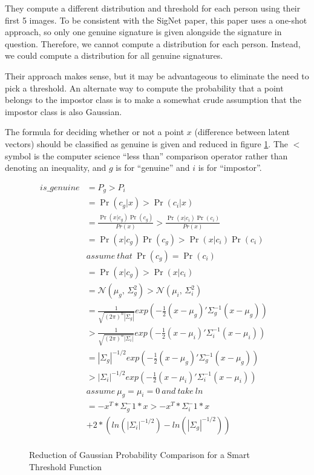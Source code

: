 They compute a different distribution and threshold for each person using their first 5 images.
To be consistent with the SigNet paper, this paper uses a one-shot approach, so only one genuine signature is given alongside the signature in question.
Therefore, we cannot compute a distribution for each person.
Instead, we could compute a distribution for all genuine signatures.

Their approach makes sense, but it may be advantageous to eliminate the need to pick a threshold.
An alternate way to compute the probability that a point belongs to the impostor class is to make a somewhat crude assumption that the impostor class is also Gaussian.

The formula for deciding whether or not a point $x$ (difference between latent vectors) should be classified as genuine is given and reduced in figure \ref{proof:gaussian}.
The $<$ symbol is the computer science ``less than'' comparison operator rather than denoting an inequality, and $g$ is for ``genuine'' and $i$ is for ``impostor''.

\begin{figure}
\begin{align*}
is\_genuine & = P_g > P_i&\\
        & = \Pr(c_g|x) > \Pr(c_i|x)&\\
        & = \frac{\Pr(x|c_g)\Pr(c_g)}{Pr(x)} > \frac{\Pr(x|c_i)\Pr(c_i)}{Pr(x)}&\\
        & = \Pr(x|c_g)\Pr(c_g) > \Pr(x|c_i)\Pr(c_i)&\\
        & assume\ that\ \Pr(c_g) = \Pr(c_i)&\\ %
        & = \Pr(x|c_g) > \Pr(x|c_i)&\\
        & = \mathcal{N}(\mu_g,\,\Sigma_g^{2}) > \mathcal{N}(\mu_i,\,\Sigma_i^{2})&\\
        & = \frac{1}{\sqrt{(2\pi)^{n}|\Sigma_g|}}exp(-\frac{1}{2}(x-\mu_g)'\Sigma_g^{-1}(x-\mu_g))&\\
        & > \frac{1}{\sqrt{(2\pi)^{n}|\Sigma_i|}}exp(-\frac{1}{2}(x-\mu_i)'\Sigma_i^{-1}(x-\mu_i))&\\
        & = |\Sigma_g|^{-1/2}exp(-\frac{1}{2}(x-\mu_g)'\Sigma_g^{-1}(x-\mu_g))&\\
        & > |\Sigma_i|^{-1/2}exp(-\frac{1}{2}(x-\mu_i)'\Sigma_i^{-1}(x-\mu_i))&\\
        & assume\ \mu_g = \mu_i = 0\ and\ take\ ln&\\
        & = -x^T * \Sigma_g^-1 * x > -x^T * \Sigma_i^-1 * x &\\
        &    + 2 * (ln(|\Sigma_i|^{-1/2}) - ln(|\Sigma_g|^{-1/2}))&\\
\end{align*}
\caption{Reduction of Gaussian Probability Comparison for a Smart Threshold Function}
\label{proof:gaussian}
\end{figure}


